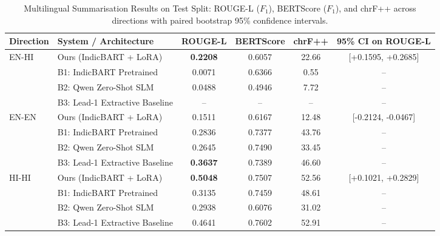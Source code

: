 \begin{table}[t]
\centering
\caption{Multilingual Summarisation Results on Test Split: ROUGE-L ($F_1$), BERTScore ($F_1$), and chrF++ across directions with paired bootstrap 95\% confidence intervals.}
\label{tab:summarisation}
\begin{tabular}{llcccc}
\toprule
\textbf{Direction} & \textbf{System / Architecture} & \textbf{ROUGE-L} & \textbf{BERTScore} & \textbf{chrF++} & \textbf{95\% CI on ROUGE-L} \\
\midrule
\multirow{4}{*}{EN-HI} & Ours (IndicBART + LoRA) & \textbf{0.2208} & 0.6057 & 22.66 & [+0.1595, +0.2685] \\
 & B1: IndicBART Pretrained & 0.0071 & 0.6366 & 0.55 & -- \\
 & B2: Qwen Zero-Shot SLM & 0.0488 & 0.4946 & 7.72 & -- \\
 & B3: Lead-1 Extractive Baseline & -- & -- & -- & -- \\
\midrule
\multirow{4}{*}{EN-EN} & Ours (IndicBART + LoRA) & 0.1511 & 0.6167 & 12.48 & [-0.2124, -0.0467] \\
 & B1: IndicBART Pretrained & 0.2836 & 0.7377 & 43.76 & -- \\
 & B2: Qwen Zero-Shot SLM & 0.2645 & 0.7490 & 33.45 & -- \\
 & B3: Lead-1 Extractive Baseline & \textbf{0.3637} & 0.7389 & 46.60 & -- \\
\midrule
\multirow{4}{*}{HI-HI} & Ours (IndicBART + LoRA) & \textbf{0.5048} & 0.7507 & 52.56 & [+0.1021, +0.2829] \\
 & B1: IndicBART Pretrained & 0.3135 & 0.7459 & 48.61 & -- \\
 & B2: Qwen Zero-Shot SLM & 0.2938 & 0.6076 & 31.02 & -- \\
 & B3: Lead-1 Extractive Baseline & 0.4641 & 0.7602 & 52.91 & -- \\
\bottomrule
\end{tabular}
\end{table}